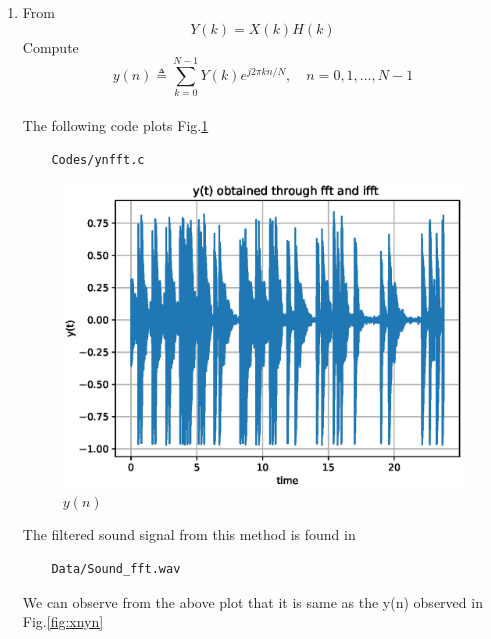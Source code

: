 \documentclass[journal,12pt,twocolumn]{IEEEtran}
\renewcommand\thesection{\arabic{section}}
\begin{document}
\begin{enumerate}[label=\thesection.\arabic*
,ref=\thesection.\theenumi]
\item From
\begin{equation}
Y(k) = X(k)H(k)
\end{equation}
Compute
\begin{equation}
y(n) \triangleq \sum_{k=0}^{N-1} Y(k) e^{j 2 \pi k n / N}, \quad n=0,1, \ldots, N-1
\end{equation}
\\
\solution
The following code plots Fig.\ref{fig:ynfft}
\begin{lstlisting}
    Codes/ynfft.c
\end{lstlisting}
\begin{figure}[!ht]
\centering
\includegraphics[width=\columnwidth]{./figs/ynfft.eps}
\caption{$y(n)$}
\label{fig:ynfft}
\end{figure}

The filtered sound signal from this method is found in
\begin{lstlisting}
    Data/Sound_fft.wav
\end{lstlisting}
We can observe from the above plot that it is same as the y(n) observed in Fig.\ref{fig:xnyn}
\end{enumerate}
\end{document}
